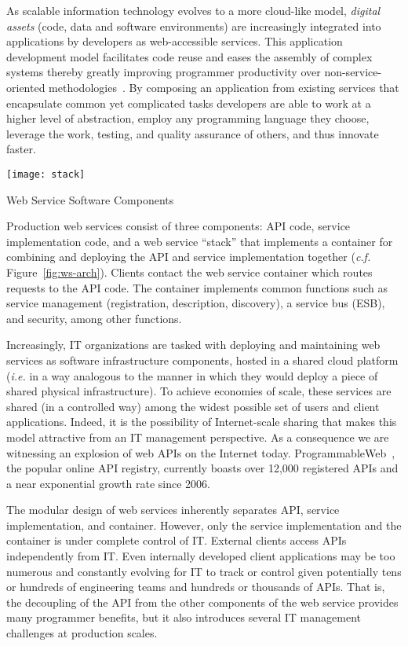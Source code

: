 As scalable information technology evolves to a more cloud-like model,
{\em digital assets} (code, data and software environments) 
are increasingly integrated into applications by developers 
as web-accessible services.
This application development model facilitates code reuse and eases the 
assembly of complex systems thereby greatly improving programmer productivity
over non-service-oriented methodologies~\cite{Dan:2008:SSR:1370916.1370923}. 
By composing an application from existing services that 
encapsulate common yet complicated tasks developers are able  
to work at a higher level of abstraction, employ any programming 
language they choose, leverage the work, testing, and quality
assurance of others, and thus innovate faster.  

\begin{floatingfigure}[rb]{2.8in}
\vspace{-0.1in}
\texttt{[image: stack]}
\vspace{-0.08in}
\caption{Web Service Software Components\label{fig:ws-arch}}
\end{floatingfigure}
Production web services consist of three components: API code, service
implementation code, and a web service ``stack'' that implements a container
for combining and deploying the API and service implementation
together ({\em c.f.} Figure~\ref{fig:ws-arch}).
Clients contact the web service container which routes requests to the
API code. The container implements common functions such as 
service management (registration, description, discovery), a service
bus (ESB), and security, among other 
functions.

Increasingly, IT organizations are tasked with deploying and 
maintaining web services as software infrastructure components, hosted in a
shared cloud platform ({\em i.e.} in a way analogous to the manner in which they
would deploy a piece of shared physical infrastructure).  
To achieve economies of scale, these services are shared (in a controlled
way) among the widest possible set of users and client applications.  Indeed,
it is the possibility of Internet-scale sharing that makes this model
attractive from an IT management perspective. As a consequence we 
are witnessing an explosion of web APIs on the Internet today. ProgrammableWeb~\cite{pweb},
the popular online API registry, currently boasts over 12,000 registered APIs and
a near exponential growth rate since 2006.

The modular design of web services inherently separates API, 
service implementation, and container. However, only 
the service implementation and the container is under complete
control of IT. External clients access APIs independently from IT.
Even internally developed client applications may be too numerous and
constantly evolving for IT to track or control given
potentially tens or hundreds of engineering teams and hundreds or 
thousands of APIs.  That is, the decoupling of the API from the 
other components of the web service provides many programmer
benefits, but it also introduces several IT management challenges 
at production scales. 

